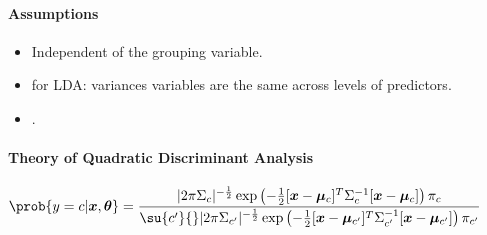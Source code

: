 \paragraph{Assumptions}
\begin{itemize}
    \item Independent  of the
        grouping variable.
    \item {} for LDA: variances  
        variables are the same across levels of predictors.
    \item {}.
\end{itemize}


\paragraph{Theory of Quadratic Discriminant Analysis}
\begin{center}
    $\prob{y=c|\bm{x},\bm{\theta}} = \dfrac{|2\pi\Sigma_{c}|^{
    -\frac{1}{2}}\exp\left(-\frac{1}{2}[\bm{x}-\bm{\mu}_{c}]^{T}\Sigma_{
    c}^{-1}[\bm{x}-\bm{\mu}_{c}]\right)\pi_{c}}{\su{c'}{}|2\pi\Sigma_{
    c'}|^{-\frac{1}{2}}\exp\left(-\frac{1}{2}[\bm{x}-\bm{\mu}_{c'}]^{T}
    \Sigma_{c'}^{-1}[\bm{x}-\bm{\mu}_{c'}]\right)\pi_{c'}}$
\end{center}

